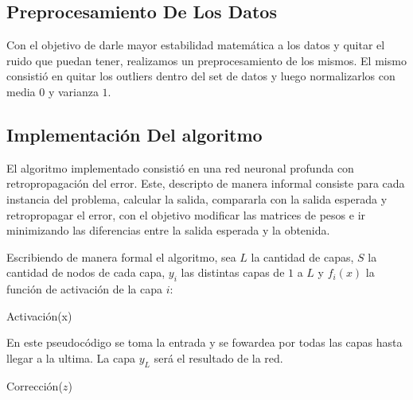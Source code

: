 \subsection{Preprocesamiento De Los Datos} 
Con el objetivo de darle mayor estabilidad matemática a los datos y quitar el ruido que puedan tener, realizamos un preprocesamiento de los mismos. El mismo consistió en quitar los outliers dentro del set de datos y luego normalizarlos con media $0$ y varianza $1$.

\subsection{Implementación Del algoritmo} 

El algoritmo implementado consistió en una red neuronal profunda con retropropagación del error. Este, descripto de manera informal consiste para cada instancia del problema, calcular la salida, compararla con la salida esperada y retropropagar el error, con el objetivo modificar las matrices de pesos e ir minimizando las diferencias entre la salida esperada y la obtenida.

Escribiendo de manera formal el algoritmo, sea $L$ la cantidad de capas, $S$ la cantidad de nodos de cada capa, $y_i$ las distintas capas de $1$ a $L$ y $f_i(x)$ la función de activación de la capa $i$:

\begin{algorithm}[h!]
\begin{algorithmic}[1]\parskip=1mm
 \caption{Activación(x)}
\end{algorithmic}
\end{algorithm}

En este pseudocódigo se toma la entrada y se fowardea por todas las capas hasta llegar a la ultima. La capa $y_L$ será el resultado de la red.

\pagebreak

\begin{algorithm}[h!]
\begin{algorithmic}[1]\parskip=1mm
 \caption{Corrección($z$)}
\end{algorithmic}
\end{algorithm}

